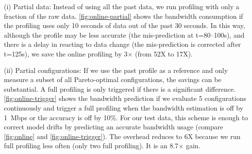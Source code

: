 (i) Partial data: Instead of using all the past data, we run profiling with only
a fraction of the raw data.  \autoref{fig:online-partial} shows the bandwidth
consumption if the profiling uses only 10 seconds of data out of the past 30
seconds. In this way, although the profile may be less accurate (the
mis-prediction at t=80--100s), and there is a delay in reacting to data change
(the mis-prediction is corrected after t=125s), we save the online profiling by
3$\times$ (from 52X to 17X).

(ii) Partial configurations: If we use the past profile as a reference and only
measure a subset of all Pareto-optimal configurations, the savings can be
substantial. A full profiling is only triggered if there is a significant
difference. \autoref{fig:online-trigger} shows the bandwidth prediction if we
evaluate 5 configurations continuously and trigger a full profiling when the
bandwidth estimation is off by \SI{1}{Mbps} or the accuracy is off by 10\%.  For
our test data, this scheme is enough to correct model drifts by predicting an
accurate bandwidth usage (compare \autoref{fig:online} and
\autoref{fig:online-trigger}).  The overhead reduces to 6X because we run full
profiling less often (only two full profiling). It is an 8.7$\times$ gain.

